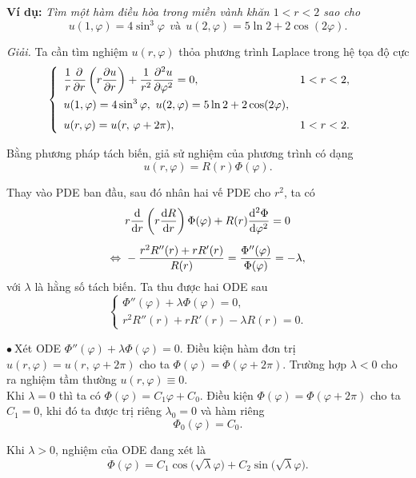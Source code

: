 \documentclass[10pt, a4paper]{article}
\begin{document}
	\textbf{Ví dụ:} \textit{Tìm một hàm điều hòa trong miền vành khăn $1<r<2$ sao cho} $$u(1,\varphi)=4\sin^3\varphi~~\textit{và}~~u(2,\varphi)=5\ln2+2\cos(2\varphi).$$
	
	\textit{Giải.} Ta cần tìm nghiệm $u(r,\varphi)$ thỏa phương trình Laplace trong hệ tọa độ cực $$\begin{cases}
		\begin{array}{ll}
			\dfrac1r\dfrac{\partial}{\partial r}\left(r\dfrac{\partial u}{\partial r}\right)+\dfrac{1}{r^2}\dfrac{\partial^2u}{\partial\varphi^2}=0, & 1<r<2,\\
			\noalign{\vskip3pt}
			u(1,\varphi)=4\sin^3\varphi,~u(2,\varphi)=5\ln2+2\cos(2\varphi),\\
			\noalign{\vskip4pt}
			u(r,\varphi)=u(r,\,\varphi+2\pi), & 1<r<2.
		\end{array}
	\end{cases}$$
	
	Bằng phương pháp tách biến, giả sử nghiệm của phương trình có dạng $$u(r,\varphi)=R(r)\Phi(\varphi).$$
	
	Thay vào PDE ban đầu, sau đó nhân hai vế PDE cho $r^2$, ta có \begin{align*}
		&r\frac{\mathrm d}{\mathrm dr}\left(r\dfrac{\mathrm dR}{\mathrm dr}\right)\Phi(\varphi)+R(r)\frac{\mathrm d^2\Phi}{\mathrm d\varphi^2}=0\\
		\noalign{\vskip5pt}
		\Leftrightarrow~&-\frac{r^2R''(r)+rR'(r)}{R(r)}=\frac{\Phi''(\varphi)}{\Phi(\varphi)}=-\lambda,
	\end{align*}
	với $\lambda$ là hằng số tách biến. Ta thu được hai ODE sau $$\begin{cases}
		\Phi''(\varphi)+\lambda\Phi(\varphi)=0,\\
		r^2R''(r)+rR'(r)-\lambda R(r)=0.
	\end{cases}$$
	
	$\bullet~$Xét ODE $\Phi''(\varphi)+\lambda\Phi(\varphi)=0$. Điều kiện hàm đơn trị $u(r,\varphi)=u(r,\,\varphi+2\pi)$ cho ta $\Phi(\varphi)=\Phi(\varphi+2\pi)$. Trường hợp $\lambda<0$ cho ra nghiệm tầm thường $u(r,\varphi)\equiv0$.\\
	
	Khi $\lambda=0$ thì ta có $\Phi(\varphi)=C_1\varphi+C_0$. Điều kiện $\Phi(\varphi)=\Phi(\varphi+2\pi)$ cho ta $C_1=0$, khi đó ta được trị riêng $\lambda_0=0$ và hàm riêng $$\Phi_0(\varphi)=C_0.$$
	
	Khi $\lambda>0$, nghiệm của ODE đang xét là $$\Phi(\varphi)=C_1\cos\big(\sqrt\lambda\varphi\big)+C_2\sin\big(\sqrt\lambda\varphi\big).$$
	
\end{document}
